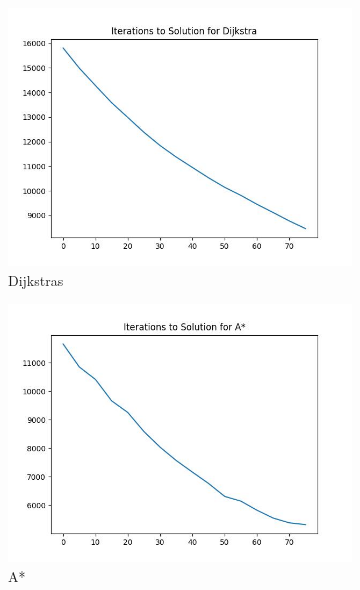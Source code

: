 \documentclass{article}
\begin{document}
\begin{figure}[H]
\begin{subfigure}{0.325\textwidth}
        \includegraphics[width = \textwidth]{plots/Dijkstra_iterations.jpg}
        \caption{Dijkstras}
    \end{subfigure}
    \begin{subfigure}{0.325\textwidth}
        \centering
        \includegraphics[width = \textwidth]{plots/A*_iterations.jpg}
        \caption{A*}
    \end{subfigure}
    \begin{subfigure}{0.325\textwidth}
        \centering

\end{subfigure}
\end{figure}
\end{document}

